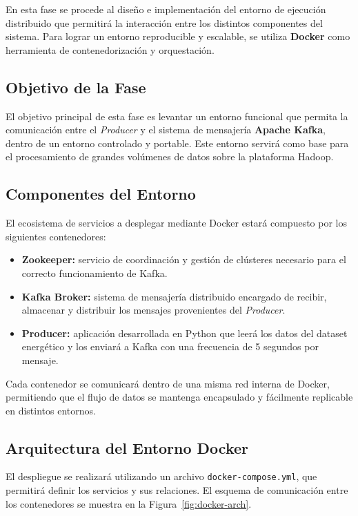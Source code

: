 \documentclass[12pt,a4paper]{article}
\begin{document}
En esta fase se procede al diseño e implementación del entorno de ejecución distribuido que permitirá la interacción entre los distintos componentes del sistema. Para lograr un entorno reproducible y escalable, se utiliza \textbf{Docker} como herramienta de contenedorización y orquestación.

\subsection{Objetivo de la Fase}
El objetivo principal de esta fase es levantar un entorno funcional que permita la comunicación entre el \textit{Producer} y el sistema de mensajería \textbf{Apache Kafka}, dentro de un entorno controlado y portable. Este entorno servirá como base para el procesamiento de grandes volúmenes de datos sobre la plataforma Hadoop.

\subsection{Componentes del Entorno}

El ecosistema de servicios a desplegar mediante Docker estará compuesto por los siguientes contenedores:

\begin{itemize}
    \item \textbf{Zookeeper:} servicio de coordinación y gestión de clústeres necesario para el correcto funcionamiento de Kafka.
    \item \textbf{Kafka Broker:} sistema de mensajería distribuido encargado de recibir, almacenar y distribuir los mensajes provenientes del \textit{Producer}.
    \item \textbf{Producer:} aplicación desarrollada en Python que leerá los datos del dataset energético y los enviará a Kafka con una frecuencia de 5 segundos por mensaje.
\end{itemize}

Cada contenedor se comunicará dentro de una misma red interna de Docker, permitiendo que el flujo de datos se mantenga encapsulado y fácilmente replicable en distintos entornos.

\subsection{Arquitectura del Entorno Docker}

El despliegue se realizará utilizando un archivo \texttt{docker-compose.yml}, que permitirá definir los servicios y sus relaciones.  
El esquema de comunicación entre los contenedores se muestra en la Figura~\ref{fig:docker-arch}.
\end{document}
